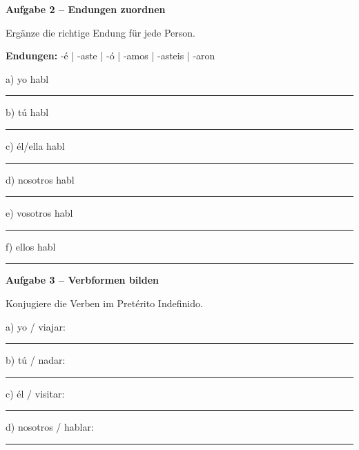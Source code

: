 \documentclass[11pt, a4paper]{article}
\newcommand{\fachfarbe}{spanisch}
\newcommand{\punktebox}[1]{\hfill\fbox{\small \_/#1}}
\newcommand{\luecke}[1]{\rule{#1}{0.4pt}}
\newenvironment{aufgabe}[1]{%
    \needspace{5\baselineskip}%
    \nopagebreak[4]%
    \vspace{10pt}
    \noindent\textbf{\textcolor{\fachfarbe}{Aufgabe #1}}
    \nopagebreak[4]%
    \vspace{5pt}
    \nopagebreak[4]%
    \begin{list}{}{\leftmargin=0pt}
    \item[]
}{%
    \end{list}
}
\begin{document}
\begin{aufgabe}{2 -- Endungen zuordnen}
Ergänze die richtige Endung für jede Person. \punktebox{6}
\end{aufgabe}

\noindent
\textbf{Endungen:} -é | -aste | -ó | -amos | -asteis | -aron

\vspace{0.5em}

\noindent
a) yo habl\luecke{2cm}

\vspace{0.8em}

\noindent
b) tú habl\luecke{2cm}

\vspace{0.8em}

\noindent
c) él/ella habl\luecke{2cm}

\vspace{0.8em}

\noindent
d) nosotros habl\luecke{2cm}

\vspace{0.8em}

\noindent
e) vosotros habl\luecke{2cm}

\vspace{0.8em}

\noindent
f) ellos habl\luecke{2cm}

\vspace{15pt}


\begin{aufgabe}{3 -- Verbformen bilden}
Konjugiere die Verben im Pretérito Indefinido. \punktebox{8}
\end{aufgabe}

\noindent
a) yo / viajar: \luecke{4cm}

\vspace{0.8em}

\noindent
b) tú / nadar: \luecke{4cm}

\vspace{0.8em}

\noindent
c) él / visitar: \luecke{4cm}

\vspace{0.8em}

\noindent
d) nosotros / hablar: \luecke{4cm}

\vspace{15pt}
\end{document}
